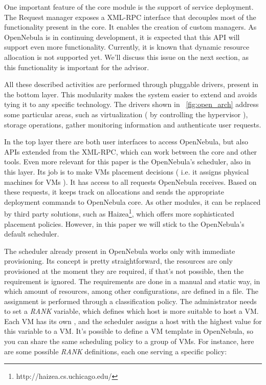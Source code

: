 One important feature of the core module is the support of service deployment. The Request manager exposes a XML-RPC interface that decouples most of the functionality present in the core. It enables the creation of custom managers. As OpenNebula is in continuing development, it is expected that this API will support even more functionality. Currently, it is known that dynamic resource allocation is not supported yet. We'll discuss this issue on the next section, as this functionality is important for the advisor.

All these described activities are performed through pluggable drivers, present in the bottom layer. This modularity makes the system easier to extend and avoids tying it to any specific technology. The drivers shown in ~\ref{fig:open_arch}  address some particular areas, such as virtualization ( by controlling the hypervisor ), storage operations, gather monitoring information and authenticate user requests.

In the top layer there are both user interfaces to access OpenNebula, but also APIs extended from the XML-RPC, which can work between the core and other tools. Even more relevant for this paper is the OpenNebula's scheduler, also in this layer. Its job is to make VMs placement decisions ( i.e. it assigns physical machines for VMs ). It has access to all requests OpenNebula receives. Based on these requests, it keeps track on allocations and sends the appropriate deployment commands to OpenNebula core. As other modules, it can be replaced by third party solutions, such as Haizea\footnote{http://haizea.cs.uchicago.edu/},  which offers more sophisticated placement policies. However, in this paper we will stick to the OpenNebula's default scheduler.

The scheduler already present in OpenNebula works only with immediate provisioning. Its concept is pretty straightforward, the resources are only provisioned at the moment they are required, if that's not possible, then the requirement is ignored. The requirements are done in a manual and static way, in which amount of resources, among other configurations, are defined in a file. The assignment is performed through a classification policy.  The administrator needs to set a \textit{RANK} variable, which defines which host is more suitable to host a VM. Each VM has its own , and the scheduler assigns a host with the highest value for this variable to a VM. It's possible to define a VM template in OpenNebula, so you can share the same scheduling policy  to a group of VMs. For instance, here are some possible \textit{RANK} definitions, each one serving a specific policy:

